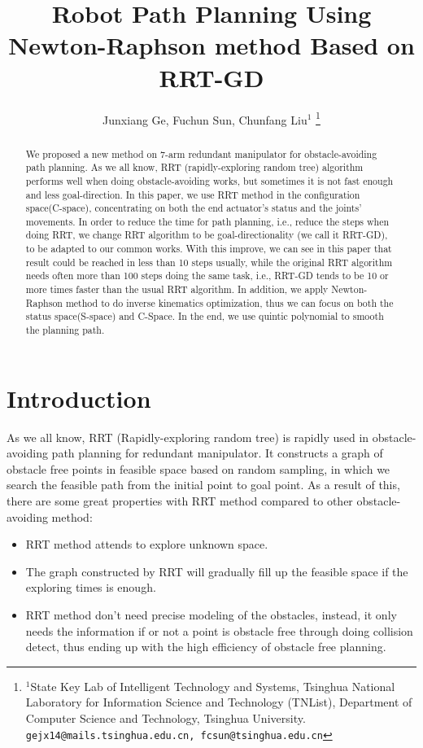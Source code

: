 \documentclass[letterpaper, 10 pt, conference]{ieeeconf}  %
\title{\LARGE \bf
Robot Path Planning Using Newton-Raphson method Based on RRT-GD
}
\author{Junxiang Ge, Fuchun Sun, Chunfang Liu$^{1}$%
\thanks{$^{1}$State Key Lab of Intelligent Technology and Systems, Tsinghua National Laboratory for Information Science and Technology (TNList), Department of Computer Science and Technology, Tsinghua University.
        {\tt\small gejx14@mails.tsinghua.edu.cn, fcsun@tsinghua.edu.cn}}%
}
\begin{document}
\maketitle
\thispagestyle{empty}
\pagestyle{empty}


\begin{abstract}

We proposed a new method on 7-arm redundant manipulator for obstacle-avoiding path planning. As we all know, RRT (rapidly-exploring random tree) algorithm performs well when doing obstacle-avoiding works, but sometimes it is not fast enough and less goal-direction. In this paper, we use RRT method in the configuration space(C-space), concentrating on both the end actuator’s status and the joints’ movements. In order to reduce the time for path planning, i.e., reduce the steps when doing RRT, we change RRT algorithm to be goal-directionality (we call it RRT-GD), to be adapted to our common works. With this improve, we can see in this paper that result could be reached in less than 10 steps usually, while the original RRT algorithm needs often more than 100 steps doing the same task, i.e., RRT-GD tends to be 10 or more times faster than the usual RRT algorithm. In addition, we apply Newton-Raphson method to do inverse kinematics optimization, thus we can focus on both the status space(S-space) and C-Space. In the end, we use quintic polynomial to smooth the planning path.

\end{abstract}


\section{Introduction}

As we all know, RRT (Rapidly-exploring random tree) is rapidly used in obstacle-avoiding path planning for redundant manipulator. It constructs a graph of obstacle free points in feasible space based on random sampling, in which we search the feasible path from the initial point to goal point. As a result of this, there are some great properties with RRT method compared to other obstacle-avoiding method:
\begin{itemize}
\item RRT method attends to explore unknown space. 
\item The graph constructed by RRT will gradually fill up the feasible space if the exploring times is enough.
\item RRT method don't need precise modeling of the obstacles, instead, it only needs the information if or not a point is obstacle free through doing collision detect, thus ending up with the high efficiency of obstacle free planning.
\end{itemize}
\end{document}
